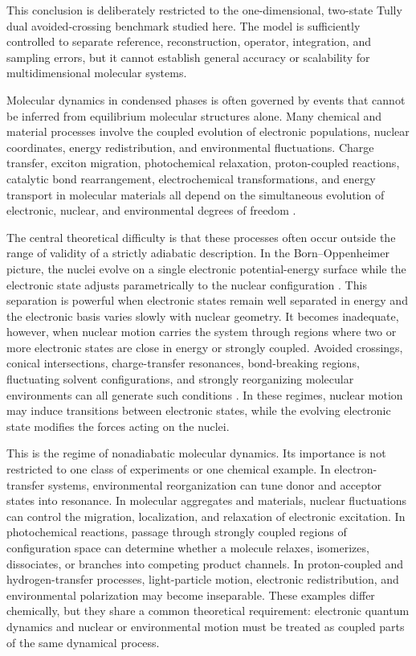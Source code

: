 \documentclass[
  11pt,
  letterpaper,
  onehalfspacing,
  normalmargins,
  equalmargins,
  oneside
]{ut-thesis}
\begin{document}
This conclusion is deliberately restricted to the one-dimensional, two-state
Tully dual avoided-crossing benchmark studied here. The model is sufficiently
controlled to separate reference, reconstruction, operator, integration, and
sampling errors, but it cannot establish general accuracy or scalability for
multidimensional molecular systems.

Molecular dynamics in condensed phases is often governed by events that cannot
be inferred from equilibrium molecular structures alone. Many chemical and
material processes involve the coupled evolution of electronic populations,
nuclear coordinates, energy redistribution, and environmental fluctuations.
Charge transfer, exciton migration, photochemical relaxation,
proton-coupled reactions, catalytic bond rearrangement, electrochemical
transformations, and energy transport in molecular materials all depend on the
simultaneous evolution of electronic, nuclear, and environmental degrees of
freedom
\cite{Curchod2018ChemRev,CrespoOtero2018ChemRev,Kapral2006ARPC,
Tully2012Perspective,Subotnik2016AnnualReview,Kapral2015JPCM}.

The central theoretical difficulty is that these processes often occur outside
the range of validity of a strictly adiabatic description. In the
Born--Oppenheimer picture, the nuclei evolve on a single electronic
potential-energy surface while the electronic state adjusts parametrically to
the nuclear configuration \cite{BornOppenheimer1927,BornHuang1954}. This
separation is powerful when electronic states remain well separated in energy
and the electronic basis varies slowly with nuclear geometry. It becomes
inadequate, however, when nuclear motion carries the system through regions
where two or more electronic states are close in energy or strongly coupled.
Avoided crossings, conical intersections, charge-transfer resonances,
bond-breaking regions, fluctuating solvent configurations, and strongly
reorganizing molecular environments can all generate such conditions
\cite{Yarkony1996RMP,Baer2006Book}. In these regimes, nuclear motion may
induce transitions between electronic states, while the evolving electronic
state modifies the forces acting on the nuclei.

This is the regime of nonadiabatic molecular dynamics. Its importance is not
restricted to one class of experiments or one chemical example. In
electron-transfer systems, environmental reorganization can tune donor and
acceptor states into resonance. In molecular aggregates and materials, nuclear
fluctuations can control the migration, localization, and relaxation of
electronic excitation. In photochemical reactions, passage through strongly
coupled regions of configuration space can determine whether a molecule
relaxes, isomerizes, dissociates, or branches into competing product channels.
In proton-coupled and hydrogen-transfer processes, light-particle motion,
electronic redistribution, and environmental polarization may become
inseparable. These examples differ chemically, but they share a common
theoretical requirement: electronic quantum dynamics and nuclear or
environmental motion must be treated as coupled parts of the same dynamical
process.
\end{document}
